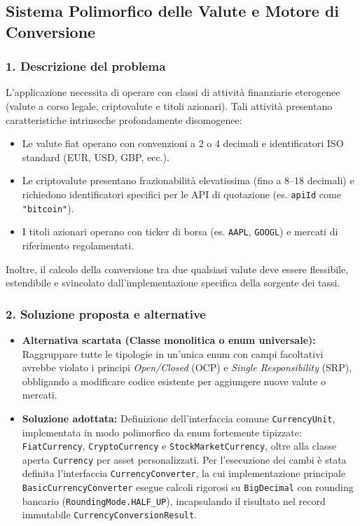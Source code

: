 \documentclass[11pt,a4paper,openright]{report}
\begin{document}
\subsection{Sistema Polimorfico delle Valute e Motore di Conversione}

\subsubsection*{1. Descrizione del problema}
L'applicazione necessita di operare con classi di attività finanziarie eterogenee (valute a corso legale, criptovalute e titoli azionari). Tali attività presentano caratteristiche intrinseche profondamente disomogenee:
\begin{itemize}
  \item Le valute fiat operano con convenzioni a 2 o 4 decimali e identificatori ISO standard (EUR, USD, GBP, ecc.).
  \item Le criptovalute presentano frazionabilità elevatissima (fino a 8--18 decimali) e richiedono identificatori specifici per le API di quotazione (es. \texttt{apiId} come \texttt{"bitcoin"}).
  \item I titoli azionari operano con ticker di borsa (es. \texttt{AAPL}, \texttt{GOOGL}) e mercati di riferimento regolamentati.
\end{itemize}
Inoltre, il calcolo della conversione tra due qualsiasi valute deve essere flessibile, estendibile e svincolato dall'implementazione specifica della sorgente dei tassi.

\subsubsection*{2. Soluzione proposta e alternative}
\begin{itemize}
  \item \textbf{Alternativa scartata (Classe monolitica o enum universale):} Raggruppare tutte le tipologie in un'unica enum con campi facoltativi avrebbe violato i principi \emph{Open/Closed} (OCP) e \emph{Single Responsibility} (SRP), obbligando a modificare codice esistente per aggiungere nuove valute o mercati.
  \item \textbf{Soluzione adottata:} Definizione dell'interfaccia comune \texttt{CurrencyUnit}, implementata in modo polimorfico da enum fortemente tipizzate: \texttt{FiatCurrency}, \texttt{CryptoCurrency} e \texttt{StockMarketCurrency}, oltre alla classe aperta \texttt{Currency} per asset personalizzati. Per l'esecuzione dei cambi è stata definita l'interfaccia \texttt{CurrencyConverter}, la cui implementazione principale \texttt{BasicCurrencyConverter} esegue calcoli rigorosi su \texttt{BigDecimal} con rounding bancario (\texttt{RoundingMode.HALF\_UP}), incapsulando il risultato nel record immutabile \texttt{CurrencyConversionResult}.
\end{itemize}
\end{document}
